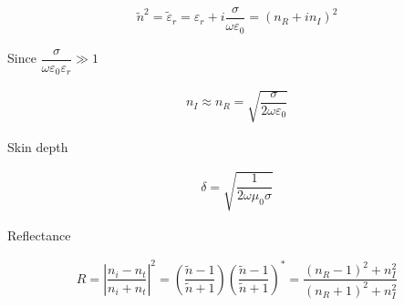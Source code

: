 \begin{equation*}
  \begin{aligned}
    \tilde{n}^2 = \tilde{\varepsilon}_r = \varepsilon_r + i \dfrac{\sigma}{\omega \varepsilon_0} = \left( n_R + i n_I \right)^2
  \end{aligned}
\end{equation*}

Since $\dfrac{\sigma}{\omega \varepsilon_0 \varepsilon_r} \gg 1 $

\begin{equation*}
  \begin{aligned}
    n_I \approx n_R = \sqrt{\dfrac{\sigma}{2 \omega \varepsilon_0} }
  \end{aligned}
\end{equation*}

Skin depth

\begin{equation*}
  \begin{aligned}
    \delta = \sqrt{\dfrac{1}{2 \omega \mu_0 \sigma} }
  \end{aligned}
\end{equation*}

Reflectance

\begin{equation*}
  \begin{aligned}
    R = \left| \dfrac{n_i - n_t}{n_i + n_t}  \right|^2 = \left( \dfrac{\tilde{n} - 1}{\tilde{n} + 1}  \right) \left( \dfrac{\tilde{n} - 1}{\tilde{n} + 1}  \right)^{*} = \dfrac{\left( n_R - 1 \right)^2 + n_I^2}{\left( n_R + 1 \right)^2 + n_I^2} 
  \end{aligned}
\end{equation*}




